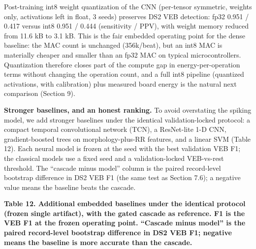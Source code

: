 \documentclass[
]{article}
\begin{document}
Post-training int8 weight quantization of the CNN (per-tensor symmetric,
weights only, activations left in float, 3 seeds) preserves DS2 VEB
detection: fp32 0.951 / 0.417 versus int8 0.951 / 0.444 (sensitivity /
PPV), with weight memory reduced from 11.6 kB to 3.1 kB. This is the
fair embedded operating point for the dense baseline: the MAC count is
unchanged (356k/beat), but an int8 MAC is materially cheaper and smaller
than an fp32 MAC on typical microcontrollers. Quantization therefore
closes part of the compute gap in energy-per-operation terms without
changing the operation count, and a full int8 pipeline (quantized
activations, with calibration) plus measured board energy is the natural
next comparison (Section 9).

\textbf{Stronger baselines, and an honest ranking.} To avoid overstating
the spiking model, we add stronger baselines under the identical
validation-locked protocol: a compact temporal convolutional network
(TCN), a ResNet-lite 1-D CNN, gradient-boosted trees on
morphology-plus-RR features, and a linear SVM (Table 12). Each neural
model is frozen at the seed with the best validation VEB F1; the
classical models use a fixed seed and a validation-locked VEB-vs-rest
threshold. The ``cascade minus model'' column is the paired record-level
bootstrap difference in DS2 VEB F1 (the same test as Section 7.6); a
negative value means the baseline beats the cascade.

\textbf{Table 12. Additional embedded baselines under the identical
protocol (frozen single artifact), with the gated cascade as reference.
F1 is the VEB F1 at the frozen operating point. ``Cascade minus model''
is the paired record-level bootstrap difference in DS2 VEB F1; negative
means the baseline is more accurate than the cascade.}
\end{document}
